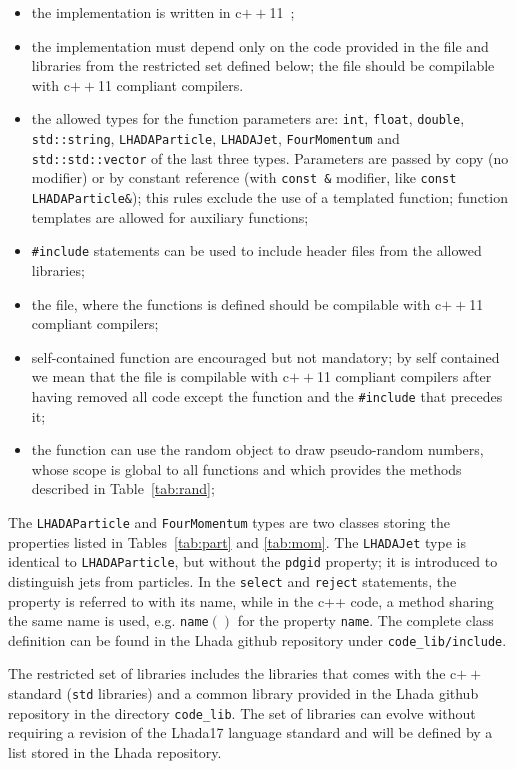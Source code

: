 \documentclass[11pt]{cernrep}
\begin{document}
\begin{itemize}
\item the implementation is written in c$++$11~\cite{bib:c++11};
\item the implementation must depend only on the code provided in the file and libraries from the restricted set defined below; the file should be compilable with c$++$11 compliant compilers.
\item the allowed types for the function parameters are: {\tt int}, {\tt float}, {\tt double}, {\tt std::string}, {\tt LHADAParticle}, {\tt LHADAJet}, {\tt FourMomentum} and {\tt std::std::vector} of the last three types. Parameters are passed by copy (no modifier) or by constant reference (with {\tt const \&} modifier, like {\tt const LHADAParticle\&}); this rules exclude the use of a templated function; function templates are allowed for auxiliary functions; 
\item {\tt \#include} statements can be used to include header files from the allowed libraries;
\item the file, where the functions is defined should be compilable with c$++$11 compliant compilers;
\item self-contained function are encouraged but not mandatory; by self contained we mean that the file is compilable with c$++$11 compliant compilers after having removed all code except the function and the {\tt \#include} that precedes it;
\item the function can use the random object to draw pseudo-random numbers, whose scope is global to all functions and which provides the methods described in Table~\ref{tab:rand}; 
\end{itemize}

The {\tt LHADAParticle} and {\tt FourMomentum} types are two classes storing the properties listed in Tables~\ref{tab:part} and \ref{tab:mom}. The {\tt LHADAJet} type is identical to {\tt LHADAParticle}, but without the {\tt pdgid} property; it is introduced to distinguish jets from particles. In the {\tt select} and {\tt reject} statements, the property is referred to with its name, while in the c++ code, a method sharing the same name is used, e.g. {\tt name$()$} for the property {\tt name}. The complete class definition can be found in the {\sc Lhada} github repository under {\tt code\_lib/include}.

The restricted set of libraries includes the libraries that comes with the c$++$ standard ({\tt std} libraries) and a common library provided in the {\sc Lhada} github repository in the directory {\tt code\_lib}.  The set of libraries can evolve without requiring a revision of the {\sc Lhada17} language standard and will be defined by a list stored in the {\sc Lhada} repository.
\end{document}
